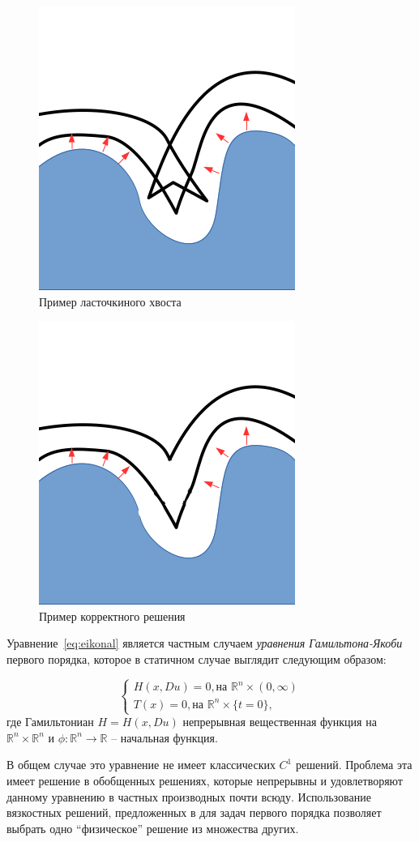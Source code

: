 \begin{figure}[h]
  \centering
  \includegraphics[width=0.3\linewidth]{img/swallow-tail-example.png}
  \hfil \caption{Пример ласточкиного хвоста}
  \label{fig:swallow-ex}

\end{figure}

\begin{figure}[h]
  \centering
  \includegraphics[width=0.3\linewidth]{img/corrct-example.png}
  \hfil \caption{Пример корректного решения}
  \label{fig:correct-exmp}

\end{figure}

Уравнение~\eqref{eq:eikonal} является частным случаем \textit{уравнения
Гамильтона-Якоби} первого порядка, которое в статичном случае выглядит
следующим образом:

\begin{equation}
  \label{eq:hje}
  \left\{ \begin{matrix}
      H(x, Du) = 0,\text{на } \mathbb{R}^n \times (0,\infty) \\
      T(x) = 0,  \text{на } \mathbb{R}^n \times \{t = 0\},
    \end{matrix}\right.
\end{equation}
где Гамильтониан $H = H(x,Du)$ непрерывная вещественная функция на
$\mathbb{R}^n \times \mathbb{R}^n$ и $\phi : \mathbb{R}^n \rightarrow
\mathbb{R}$ -- начальная функция.

В общем случае это уравнение не имеет классических $C^1$
решений. Проблема эта имеет решение в обобщенных решениях, которые
непрерывны и удовлетворяют данному уравнению в частных производных
почти всюду. Использование вязкостных  решений, предложенных в
\cite{V1984,V1983} для задач первого порядка позволяет выбрать одно
``физическое'' решение из множества других. 

